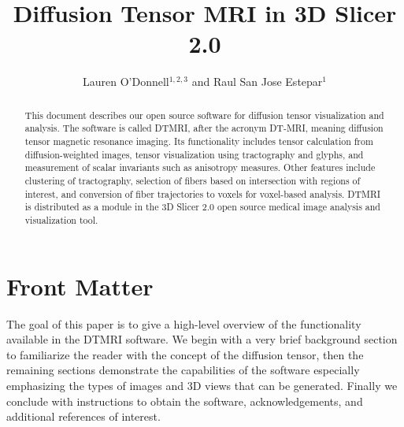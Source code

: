 \documentclass{InsightArticle}
\title{Diffusion Tensor MRI in 3D Slicer 2.0}
\author{Lauren O'Donnell$^{1,2,3}$ and Raul San Jose Estepar$^{1}$}
\begin{document}
\ifpdf
\else
\fi


\maketitle


\ifhtml
\chapter*{Front Matter\label{front}}
\fi


\begin{abstract}
\noindent
This document describes our open source software for diffusion tensor
visualization and analysis.  The software is called DTMRI, after the
acronym DT-MRI, meaning diffusion tensor magnetic resonance imaging.
Its functionality includes tensor calculation from diffusion-weighted
images, tensor visualization using tractography and glyphs, and
measurement of scalar invariants such as anisotropy measures.  Other
features include clustering of tractography, selection of fibers based
on intersection with regions of interest, and conversion of fiber
trajectories to voxels for voxel-based analysis.  DTMRI is distributed
as a module in the 3D Slicer 2.0 open source medical image analysis
and visualization tool.

\end{abstract}

\tableofcontents

The goal of this paper is to give a high-level overview of the
functionality available in the DTMRI software.  We begin with a very
brief background section to familiarize the reader with the concept of
the diffusion tensor, then the remaining sections demonstrate the
capabilities of the software especially emphasizing the types of
images and 3D views that can be generated.  Finally we conclude with
instructions to obtain the software, acknowledgements, and additional
references of interest.
\end{document}

